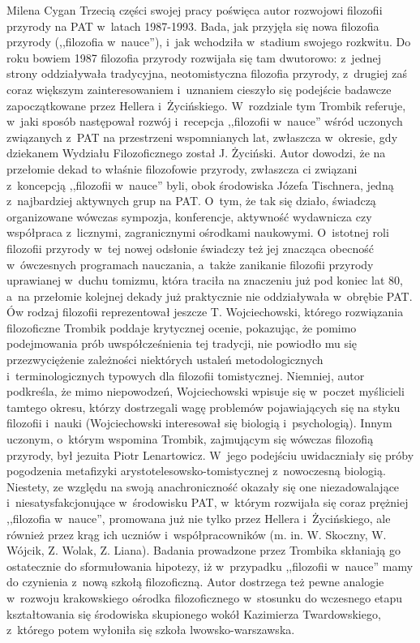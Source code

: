 \begin{newrevplenv}{Milena Cygan}
Trzecią części swojej pracy poświęca autor rozwojowi filozofii przyrody na PAT w~latach 1987-1993. Bada, jak przyjęła się nowa filozofia przyrody (,,filozofia w~nauce''), i~jak wchodziła w~stadium swojego rozkwitu. Do roku bowiem 1987 filozofia przyrody rozwijała się tam dwutorowo: z~jednej strony oddziaływała tradycyjna, neotomistyczna filozofia przyrody, z~drugiej zaś coraz większym zainteresowaniem i~uznaniem cieszyło się podejście badawcze zapoczątkowane przez Hellera i~Życińskiego. W~rozdziale tym Trombik referuje, w~jaki sposób następował rozwój i~recepcja ,,filozofii w~nauce'' wśród uczonych związanych z~PAT na przestrzeni wspomnianych lat, zwłaszcza w~okresie, gdy dziekanem Wydziału Filozoficznego został J. Życiński. Autor dowodzi, że na przełomie dekad to właśnie filozofowie przyrody, zwłaszcza ci związani z~koncepcją ,,filozofii w~nauce'' byli, obok środowiska Józefa Tischnera, jedną z~najbardziej aktywnych grup na PAT. O~tym, że tak się działo, świadczą organizowane wówczas sympozja, konferencje, aktywność wydawnicza czy współpraca z~licznymi, zagranicznymi ośrodkami naukowymi. O~istotnej roli filozofii przyrody w~tej nowej odsłonie świadczy też jej znacząca obecność w~ówczesnych programach nauczania, a~także zanikanie filozofii przyrody uprawianej w~duchu tomizmu, która traciła na znaczeniu już pod koniec lat 80, a~na przełomie kolejnej dekady już praktycznie nie oddziaływała w~obrębie PAT. Ów rodzaj filozofii reprezentował jeszcze T. Wojciechowski, którego rozwiązania filozoficzne Trombik poddaje krytycznej ocenie, pokazując, że pomimo podejmowania prób uwspółcześnienia tej tradycji, nie powiodło mu się przezwyciężenie zależności niektórych ustaleń metodologicznych i~terminologicznych typowych dla filozofii tomistycznej. Niemniej, autor podkreśla, że mimo niepowodzeń, Wojciechowski wpisuje się w~poczet myślicieli tamtego okresu, którzy dostrzegali wagę problemów pojawiających się na styku filozofii i~nauki (Wojciechowski interesował się biologią i~psychologią). Innym uczonym, o~którym wspomina Trombik, zajmującym się wówczas filozofią przyrody, był jezuita Piotr Lenartowicz. W~jego podejściu uwidaczniały się próby pogodzenia metafizyki arystotelesowsko-tomistycznej z~nowoczesną biologią. Niestety, ze względu na swoją anachroniczność okazały się one niezadowalające i~niesatysfakcjonujące w~środowisku PAT, w~którym rozwijała się coraz prężniej ,,filozofia w~nauce'', promowana już nie tylko przez Hellera i~Życińskiego, ale również przez krąg ich uczniów i~współpracowników (m. in. W. Skoczny, W. Wójcik, Z. Wolak, Z. Liana). Badania prowadzone przez Trombika skłaniają go ostatecznie do sformułowania hipotezy, iż w~przypadku ,,filozofii w~nauce'' mamy do czynienia z~nową szkołą filozoficzną. Autor dostrzega też pewne analogie w~rozwoju krakowskiego ośrodka filozoficznego w~stosunku do wczesnego etapu kształtowania się środowiska skupionego wokół Kazimierza Twardowskiego, z~którego potem wyłoniła się szkoła lwowsko-warszawska.


\end{newrevplenv}
